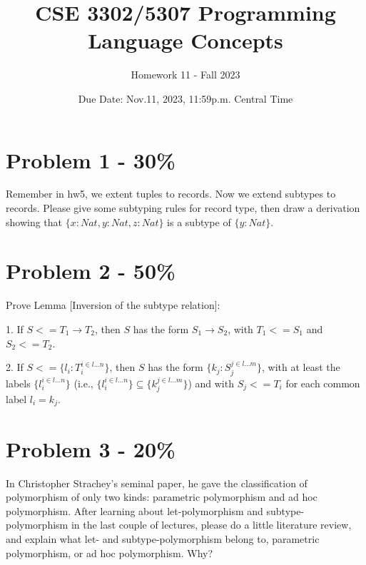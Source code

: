\documentclass{article}
\begin{document}
\title{CSE 3302/5307 Programming Language Concepts}
\author{Homework 11 - Fall 2023}
\date{Due Date: Nov.11, 2023, 11:59p.m. Central Time}
\maketitle
\thispagestyle{fancy}


\section*{Problem 1 - 30\%}

Remember in hw5, we extent tuples to records. Now we extend subtypes to records. Please give some subtyping rules for record type, then draw a derivation showing that $\{x:Nat, y:Nat, z:Nat\}$ is a subtype of $\{y:Nat\}$.



\section*{Problem 2 - 50\%}

Prove Lemma [Inversion of the subtype relation]:
	
	1. If $S <= T_1 \rightarrow T_2$, then $S$ has the form $S_1 \rightarrow S_2$, with $T_1 <= S_1$ and $S_2 <= T_2$.
	
	2. If $S <= \{l_i:T_i^{i \in l...n}\}$, then $S$ has the form $\{k_j:S_j^{j \in l...m}\}$, with at least the labels $\{l_i^{i \in l...n}\}$ (i.e., $\{l_i^{i \in l...n}\} \subseteq \{k_j^{j \in l...m}\}$) and with $S_j <= T_i$ for each common label $l_i=k_j$.

\section*{Problem 3 - 20\%}
In Christopher Strachey's seminal paper\cite{strachey2000}, he gave the classification of polymorphism of only two kinds: parametric polymorphism and ad hoc
polymorphism. After learning about let-polymorphism and subtype-polymorphism
in the last couple of lectures, please do a little literature review, and explain what let- and subtype-polymorphism belong to, parametric polymorphism, or
ad hoc polymorphism. Why?


\end{document}
